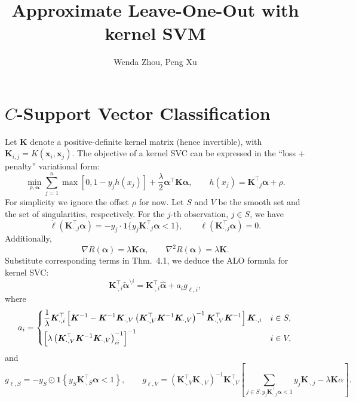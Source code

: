 \documentclass[11pt]{article}
\title{Approximate Leave-One-Out with kernel SVM}
\author{Wenda Zhou, Peng Xu}
\newcommand{\bx}{\bm{x}}
\newcommand{\bK}{\bm{K}}
\newcommand{\balpha}{\bm{\alpha}}
\newcommand{\refthm}[2]{#1~#2}
\begin{document}
\maketitle

\section{\(C\)-Support Vector Classification}
Let \(\bK\) denote a positive-definite kernel matrix (hence invertible), with \(\bK_{i,j}=K(\bx_i,\bx_j)\). The objective of a kernel SVC can be expressed in the ``loss \(+\) penalty'' variational form:
\begin{equation}
\min_{\rho,\balpha}\sum_{j=1}^{n}\max\left[0, 1-y_jh(x_j)\right]+\frac{\lambda}{2}\balpha^\top\bK\balpha, \qquad h(x_j)=\bK_{\cdot,j}^\top\balpha+\rho.
\end{equation}
For simplicity we ignore the offset \(\rho\) for now. Let \(S\) and \(V\) be the smooth set and the set of singularities, respectively. For the \(j\)-th observation, \(j\in S\), we have \[\dot{\ell}(\bK_{\cdot,j}^\top\balpha)=-y_j\cdot\bm{1}\{y_j\bK_{\cdot,j}^\top\balpha<1\},\qquad\ddot{\ell}(\bK_{\cdot,j}^\top\balpha)=0.\] Additionally, \[\nabla R(\balpha)=\lambda\bK\balpha,\qquad\nabla^2R(\balpha)=\lambda\bK.\] Substitute corresponding terms in \refthm{Thm.}{4.1}, we deduce the ALO formula for kernel SVC: \[\bK_{\cdot,i}^\top\tilde{\balpha}^{\setminus i}=\bK_{\cdot,i}^\top\hat{\balpha}+a_ig_{\ell,i},\] where \[a_i=\begin{dcases}
\frac{1}{\lambda}\bK_{\cdot,i}^\top\left[\bK^{-1}-\bK^{-1}\bK_{\cdot,V}\left(\bK_{\cdot,V}^\top\bK^{-1}\bK_{\cdot,V}\right)^{-1}\bK_{\cdot,V}^\top\bK^{-1}\right]\bK_{\cdot,i} & i\in S,\\
\left[\lambda\left(\bK_{\cdot,V}^\top\bK^{-1}\bK_{\cdot,V}\right)^{-1}_{ii}\right]^{-1} & i\in V,
\end{dcases}\] and \[g_{\ell, S}=-y_S\odot\bm{1}\left\{y_S\bK_{\cdot,S}^\top\balpha<1\right\},\qquad g_{\ell, V}=\left(\bK_{\cdot,V}^\top\bK_{\cdot,V}\right)^{-1}\bK_{\cdot,V}^\top\left[\sum_{j\in S:y_j\bK_{\cdot,j}^\top\balpha<1}y_j\bK_{\cdot,j}-\lambda\bK\alpha\right].\]
\end{document}
